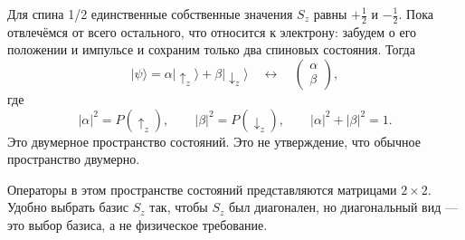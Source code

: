 Для спина 1/2 единственные собственные значения \(S_z\) равны \(+\tfrac12\) и \(-\tfrac12\). Пока отвлечёмся от всего остального, что относится к электрону: забудем о его положении и импульсе и сохраним только два спиновых состояния. Тогда
\begin{equation}
|\psi\rangle
=
\alpha|\uparrow_z\rangle+\beta|\downarrow_z\rangle
\quad\longleftrightarrow\quad
\begin{pmatrix}
\alpha\\
\beta
\end{pmatrix},
\end{equation}
где
\begin{equation}
|\alpha|^2=P(\uparrow_z),
\qquad
|\beta|^2=P(\downarrow_z),
\qquad
|\alpha|^2+|\beta|^2=1.
\end{equation}
Это двумерное пространство состояний. Это не утверждение, что обычное пространство двумерно.

\begin{classroomqa}
\end{classroomqa}

Операторы в этом пространстве состояний представляются матрицами \(2\times2\). Удобно выбрать базис \(S_z\) так, чтобы \(S_z\) был диагонален, но диагональный вид — это выбор базиса, а не физическое требование.

\begin{classroomqa}
\end{classroomqa}

\begin{classroomqa}
\end{classroomqa}

